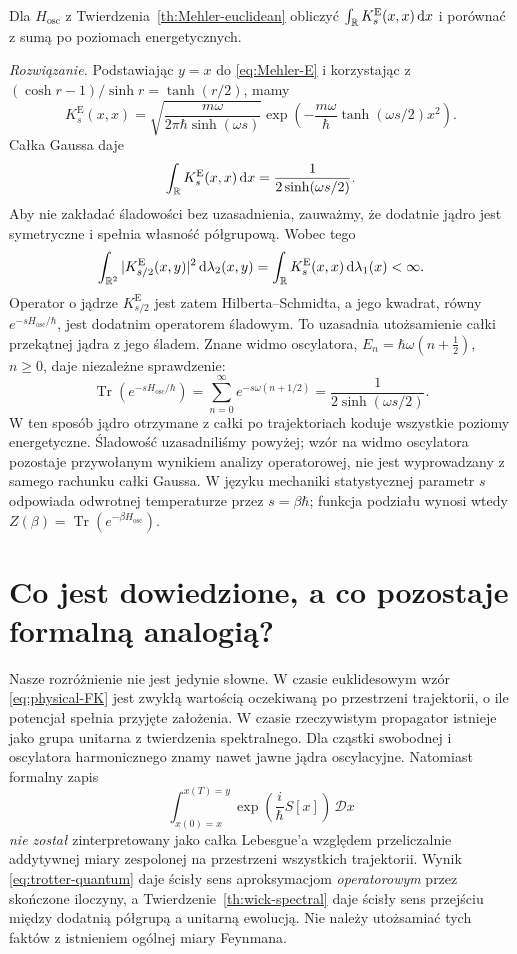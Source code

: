\begin{zadanie}
Dla $H_{\mathrm{osc}}$ z
Twierdzenia~\ref{th:Mehler-euclidean} obliczyć
$\int_{\mathbb{R}}K_s^{\mathrm E}(x,x)\,\mathrm{d} x$ i porównać
z sumą po poziomach energetycznych.

\emph{Rozwiązanie.} Podstawiając $y=x$ do
\eqref{eq:Mehler-E} i korzystając z
$(\cosh r-1)/\sinh r=\tanh(r/2)$, mamy
\[
 K_s^{\mathrm E}(x,x)=
 \sqrt{\frac{m\omega}{2\pi\hbar\sinh(\omega s)}}
 \exp\left(-\frac{m\omega}{\hbar}
     \tanh(\omega s/2)x^2\right).
\]
Całka Gaussa daje
\[
 \int_{\mathbb{R}}K_s^{\mathrm E}(x,x)\,\mathrm{d} x
 =\frac1{2\sinh(\omega s/2)}.
\]
Aby nie zakładać śladowości bez uzasadnienia,
zauważmy, że dodatnie jądro jest symetryczne i spełnia
własność półgrupową. Wobec tego
\[
\int_{\mathbb{R}^2}|K_{s/2}^{\mathrm E}(x,y)|^2\,
\mathrm{d}\lambda_2(x,y)=\int_{\mathbb{R}}K_s^{\mathrm E}(x,x)\,
\mathrm{d}\lambda_1(x)<\infty.
\]
Operator o jądrze $K_{s/2}^{\mathrm E}$ jest zatem
Hilberta--Schmidta, a jego kwadrat, równy
$e^{-sH_{\mathrm{osc}}/\hbar}$, jest dodatnim
operatorem śladowym. To uzasadnia utożsamienie
całki przekątnej jądra z jego śladem.
Znane widmo oscylatora,
$E_n=\hbar\omega(n+\frac12)$, $n\ge0$,
daje niezależne sprawdzenie:
\[
 \operatorname{Tr}(e^{-sH_{\mathrm{osc}}/\hbar})
 =\sum_{n=0}^\infty e^{-s\omega(n+1/2)}
 =\frac1{2\sinh(\omega s/2)}.
\]
W ten sposób jądro otrzymane z całki po trajektoriach
koduje wszystkie poziomy energetyczne. Śladowość
uzasadniliśmy powyżej; wzór na widmo oscylatora
pozostaje przywołanym wynikiem analizy operatorowej,
nie jest wyprowadzany z samego rachunku całki Gaussa.
W języku mechaniki statystycznej parametr $s$ odpowiada
odwrotnej temperaturze przez $s=\beta\hbar$;
funkcja podziału wynosi wtedy
$Z(\beta)=\operatorname{Tr}(e^{-\beta H_{\mathrm{osc}}})$.
\end{zadanie}

\section{Co jest dowiedzione, a co pozostaje formalną analogią?}

Nasze rozróżnienie nie jest jedynie słowne. W czasie
euklidesowym wzór \eqref{eq:physical-FK} jest zwykłą
wartością oczekiwaną po przestrzeni trajektorii, o ile
potencjał spełnia przyjęte założenia. W czasie rzeczywistym
propagator istnieje jako grupa unitarna z twierdzenia
spektralnego. Dla cząstki swobodnej i oscylatora
harmonicznego znamy nawet jawne jądra oscylacyjne.
Natomiast formalny zapis
\[
 \int_{x(0)=x}^{x(T)=y}
  \exp\left(\frac{i}{\hbar}S[x]\right)\,\mathcal D x
\]
\emph{nie został} zinterpretowany jako całka Lebesgue'a
względem przeliczalnie addytywnej miary zespolonej na
przestrzeni wszystkich trajektorii.
Wynik \eqref{eq:trotter-quantum} daje ścisły sens
aproksymacjom \emph{operatorowym} przez skończone iloczyny,
a Twierdzenie~\ref{th:wick-spectral} daje ścisły sens
przejściu między dodatnią półgrupą a unitarną ewolucją.
Nie należy utożsamiać tych faktów z istnieniem
ogólnej miary Feynmana.

